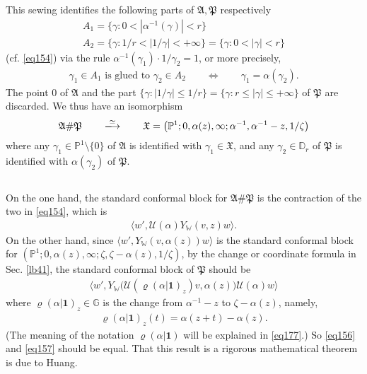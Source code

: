 \documentclass[12pt,a4paper,notitlepage]{article}
\theoremstyle{definition}
\theoremstyle{plain}
\newcommand{\fk}{\mathfrak}
\newcommand{\mc}{\mathcal}
\newcommand{\id}{\mathbf{1}}
\newcommand{\bk}[1]{\langle {#1}\rangle}
\newcommand{\bigbk}[1]{\big\langle {#1}\big\rangle}
\newcommand{\Wbb}{\mathbb W}
\newcommand{\Gbb}{\mathbb G}
\newcommand{\Pbb}{\mathbb P}
\newcommand{\Dbb}{\mathbb D}
\numberwithin{equation}{section}
\begin{document}
This sewing identifies the following  parts of $\fk A,\fk P$ respectively
\begin{gather*}
A_1=\{\gamma:0<|\alpha^{-1}(\gamma)|<r\}\\
A_2=\{\gamma:1/r<|1/\gamma|<+\infty\}=\{\gamma:0<|\gamma|<r\}	
\end{gather*}
(cf. \eqref{eq154}) via the rule $\alpha^{-1}(\gamma_1)\cdot 1/\gamma_2=1$, or more precisely,
\begin{align}
\gamma_1\in A_1 \text{ is glued to }\gamma_2\in A_2\qquad\Longleftrightarrow\qquad \gamma_1=\alpha(\gamma_2). 	
\end{align}
The point $0$ of $\fk A$ and the part $\{\gamma:|1/\gamma|\leq 1/r\}=\{\gamma:r\leq |\gamma|\leq+\infty\}$ of $\fk P$ are discarded. We thus have an isomorphism
\begin{align}
\fk A\#\fk P\qquad\xlongrightarrow{\simeq}\qquad\fk X=\big(\Pbb^1;0,\alpha(z),\infty;\alpha^{-1},\alpha^{-1}-z,1/\zeta\big)	
\end{align}
where any $\gamma_1\in\Pbb^1\setminus\{0\}$ of $\fk A$ is identified with $\gamma_1\in\fk X$, and any $\gamma_2\in\Dbb_r$ of $\fk P$ is identified with $\alpha(\gamma_2)$ of $\fk P$. 



\subsection{}


On the one hand, the standard conformal block for $\fk A\#\fk P$ is the contraction of the two in \eqref{eq154}, which is
\begin{align}
\bk{w',\mc U(\alpha)Y_\Wbb(v,z)w}.\label{eq156}	
\end{align}
On the other hand, since $\bk{w',Y_\Wbb(v,\alpha(z))w}$ is the standard conformal block for $(\Pbb^1;0,\alpha(z),\infty;\zeta,\zeta-\alpha(z),1/\zeta)$, by the change or coordinate formula in Sec. \ref{lb41}, the standard conformal block  of $\fk P$ should be
\begin{align}
\bigbk{w',Y_\Wbb\big(\mc U(\varrho(\alpha|\id)_z)v,\alpha(z)\big)\mc U(\alpha)w}	\label{eq157}
\end{align}
where $\varrho(\alpha|\id)_z\in\Gbb$ is the change from $\alpha^{-1}-z$ to $\zeta-\alpha(z)$, namely, \index{zz@$\varrho(\alpha\lvert\id),\varrho(\eta\lvert\mu)$}
\begin{align}
\varrho(\alpha|\id)_z(t)=\alpha(z+t)-\alpha(z).\label{eq161}
\end{align}
(The meaning of the notation $\varrho(\alpha|\id)$ will be explained in \eqref{eq177}.) So \eqref{eq156} and \eqref{eq157} should be equal. That this result is a rigorous mathematical theorem is due to Huang. 
\end{document}
